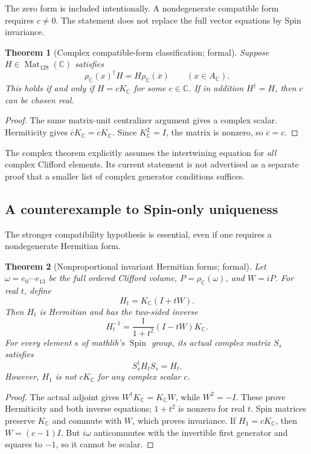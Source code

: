 \documentclass[11pt]{article}
\newtheorem{theorem}{Theorem}[section]
\newcommand{\C}{\mathbb C}
\newcommand{\Spin}{\operatorname{Spin}}
\newcommand{\Mat}{\operatorname{Mat}}
\begin{document}
The zero form is included intentionally. A nondegenerate compatible form requires $c\ne0$. The statement does not replace the full vector equations by Spin invariance.

\begin{theorem}[Complex compatible-form classification; formal]
Suppose $H\in\Mat_{128}(\C)$ satisfies
\[
 \rho_\C(x)^\dagger H=H\rho_\C(\overline x)\qquad(x\in A_\C).
\]
This holds if and only if $H=cK_\C$ for some $c\in\C$. If in addition $H^\dagger=H$, then $c$ can be chosen real.
\end{theorem}
\begin{proof}
The same matrix-unit centralizer argument gives a complex scalar. Hermiticity gives $\overline c K_\C=cK_\C$. Since $K_\C^2=I$, the matrix is nonzero, so $\overline c=c$.
\end{proof}

The complex theorem explicitly assumes the intertwining equation for \emph{all} complex Clifford elements. Its current statement is not advertised as a separate proof that a smaller list of complex generator conditions suffices.

\subsection{A counterexample to Spin-only uniqueness}
The stronger compatibility hypothesis is essential, even if one requires a nondegenerate Hermitian form.

\begin{theorem}[Nonproportional invariant Hermitian forms; formal]
Let $\omega=e_0\cdots e_{13}$ be the full ordered Clifford volume, $P=\rho_\C(\omega)$, and $W=iP$. For real $t$, define
\[
 H_t=K_\C(I+tW).
\]
Then $H_t$ is Hermitian and has the two-sided inverse
\[
 H_t^{-1}=\frac{1}{1+t^2}(I-tW)K_\C.
\]
For every element $s$ of mathlib's $\Spin$ group, its actual complex matrix $S_s$ satisfies
\[
 S_s^\dagger H_t S_s=H_t.
\]
However, $H_1$ is not $cK_\C$ for any complex scalar $c$.
\end{theorem}
\begin{proof}
The actual adjoint gives $W^\dagger K_\C=K_\C W$, while $W^2=-I$. These prove Hermiticity and both inverse equations; $1+t^2$ is nonzero for real $t$. Spin matrices preserve $K_\C$ and commute with $W$, which proves invariance. If $H_1=cK_\C$, then $W=(c-1)I$. But $i\omega$ anticommutes with the invertible first generator and squares to $-1$, so it cannot be scalar.
\end{proof}
\end{document}
